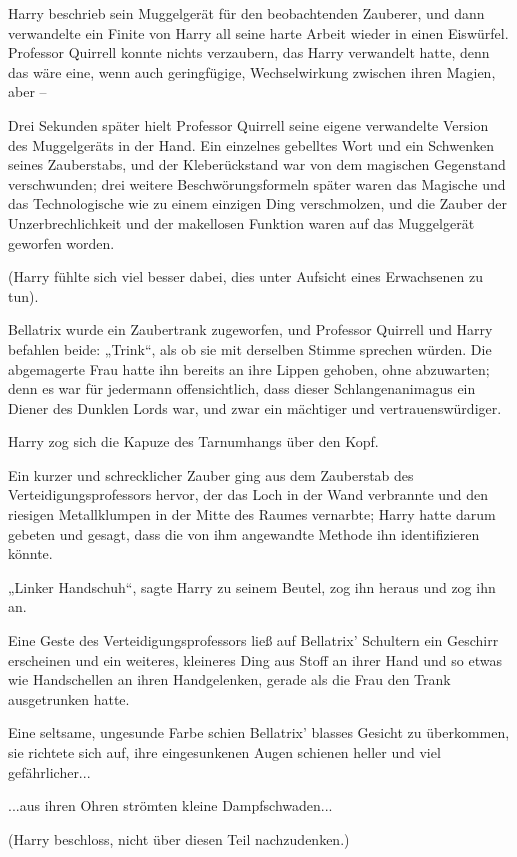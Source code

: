 {Harry beschrieb sein Muggelgerät für den beobachtenden Zauberer, und dann verwandelte ein Finite von Harry all seine harte Arbeit wieder in einen Eiswürfel. Professor Quirrell konnte nichts verzaubern, das Harry verwandelt hatte, denn das wäre eine, wenn auch geringfügige, Wechselwirkung zwischen ihren Magien, aber --

Drei Sekunden später hielt Professor Quirrell seine eigene verwandelte Version des Muggelgeräts in der Hand. Ein einzelnes gebelltes Wort und ein Schwenken seines Zauberstabs, und der Kleberückstand war von dem magischen Gegenstand verschwunden; drei weitere Beschwörungsformeln später waren das Magische und das Technologische wie zu einem einzigen Ding verschmolzen, und die Zauber der Unzerbrechlichkeit und der makellosen Funktion waren auf das Muggelgerät geworfen worden.

(Harry fühlte sich viel besser dabei, dies unter Aufsicht eines Erwachsenen zu tun).

Bellatrix wurde ein Zaubertrank zugeworfen, und Professor Quirrell und Harry befahlen beide: „Trink“, als ob sie mit derselben Stimme sprechen würden. Die abgemagerte Frau hatte ihn bereits an ihre Lippen gehoben, ohne abzuwarten; denn es war für jedermann offensichtlich, dass dieser Schlangenanimagus ein Diener des Dunklen Lords war, und zwar ein mächtiger und vertrauenswürdiger.

Harry zog sich die Kapuze des Tarnumhangs über den Kopf.

Ein kurzer und schrecklicher Zauber ging aus dem Zauberstab des Verteidigungsprofessors hervor, der das Loch in der Wand verbrannte und den riesigen Metallklumpen in der Mitte des Raumes vernarbte; Harry hatte darum gebeten und gesagt, dass die von ihm angewandte Methode ihn identifizieren könnte.

„Linker Handschuh“, sagte Harry zu seinem Beutel, zog ihn heraus und zog ihn an.

Eine Geste des Verteidigungsprofessors ließ auf Bellatrix' Schultern ein Geschirr erscheinen und ein weiteres, kleineres Ding aus Stoff an ihrer Hand und so etwas wie Handschellen an ihren Handgelenken, gerade als die Frau den Trank ausgetrunken hatte.

Eine seltsame, ungesunde Farbe schien Bellatrix' blasses Gesicht zu überkommen, sie richtete sich auf, ihre eingesunkenen Augen schienen heller und viel gefährlicher...

...aus ihren Ohren strömten kleine Dampfschwaden...

(Harry beschloss, nicht über diesen Teil nachzudenken.)

}
